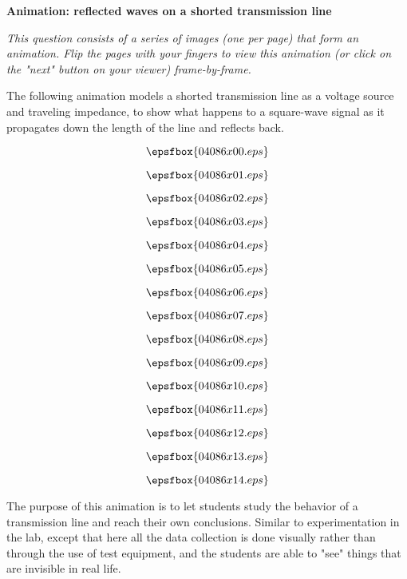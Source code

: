

\centerline{\bf Animation: reflected waves on a shorted transmission line}

\vskip 10pt

{\it This question consists of a series of images (one per page) that form an animation.  Flip the pages with your fingers to view this animation (or click on the "next" button on your viewer) frame-by-frame.}

\vskip 10pt

The following animation models a shorted transmission line as a voltage source and traveling impedance, to show what happens to a square-wave signal as it propagates down the length of the line and reflects back.

\vfil \eject
$$\epsfbox{04086x00.eps}$$

\vfil \eject
$$\epsfbox{04086x01.eps}$$

\vfil \eject
$$\epsfbox{04086x02.eps}$$

\vfil \eject
$$\epsfbox{04086x03.eps}$$

\vfil \eject
$$\epsfbox{04086x04.eps}$$

\vfil \eject
$$\epsfbox{04086x05.eps}$$

\vfil \eject
$$\epsfbox{04086x06.eps}$$

\vfil \eject
$$\epsfbox{04086x07.eps}$$

\vfil \eject
$$\epsfbox{04086x08.eps}$$

\vfil \eject
$$\epsfbox{04086x09.eps}$$

\vfil \eject
$$\epsfbox{04086x10.eps}$$

\vfil \eject
$$\epsfbox{04086x11.eps}$$

\vfil \eject
$$\epsfbox{04086x12.eps}$$

\vfil \eject
$$\epsfbox{04086x13.eps}$$

\vfil \eject
$$\epsfbox{04086x14.eps}$$


\vfil \eject














The purpose of this animation is to let students study the behavior of a transmission line and reach their own conclusions.  Similar to experimentation in the lab, except that here all the data collection is done visually rather than through the use of test equipment, and the students are able to "see" things that are invisible in real life.




